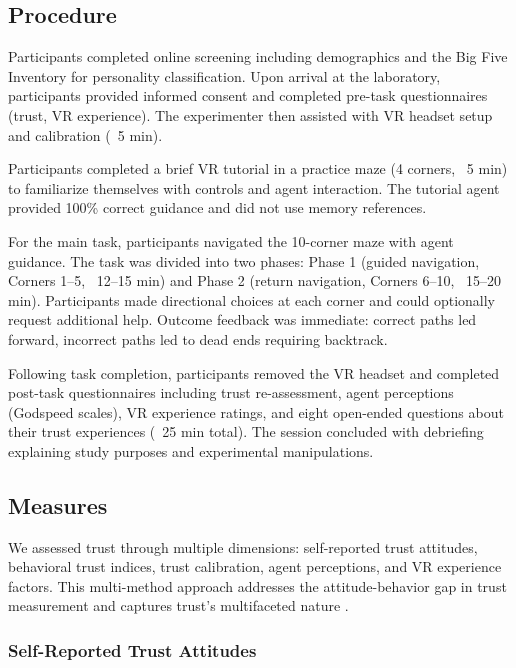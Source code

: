 \documentclass[12pt]{article}
\begin{document}
\subsection{Procedure}

Participants completed online screening including demographics and the Big Five Inventory for personality classification. Upon arrival at the laboratory, participants provided informed consent and completed pre-task questionnaires (trust, VR experience). The experimenter then assisted with VR headset setup and calibration (~5 min).

Participants completed a brief VR tutorial in a practice maze (4 corners, ~5 min) to familiarize themselves with controls and agent interaction. The tutorial agent provided 100\% correct guidance and did not use memory references.

For the main task, participants navigated the 10-corner maze with agent guidance. The task was divided into two phases: Phase 1 (guided navigation, Corners 1--5, ~12--15 min) and Phase 2 (return navigation, Corners 6--10, ~15--20 min). Participants made directional choices at each corner and could optionally request additional help. Outcome feedback was immediate: correct paths led forward, incorrect paths led to dead ends requiring backtrack.

Following task completion, participants removed the VR headset and completed post-task questionnaires including trust re-assessment, agent perceptions (Godspeed scales), VR experience ratings, and eight open-ended questions about their trust experiences (~25 min total). The session concluded with debriefing explaining study purposes and experimental manipulations.

\subsection{Measures}

We assessed trust through multiple dimensions: self-reported trust attitudes, behavioral trust indices, trust calibration, agent perceptions, and VR experience factors. This multi-method approach addresses the attitude-behavior gap in trust measurement \citep{mayer1995integrative} and captures trust's multifaceted nature \citep{lee2004trust}.

\subsubsection{Self-Reported Trust Attitudes}
\end{document}
